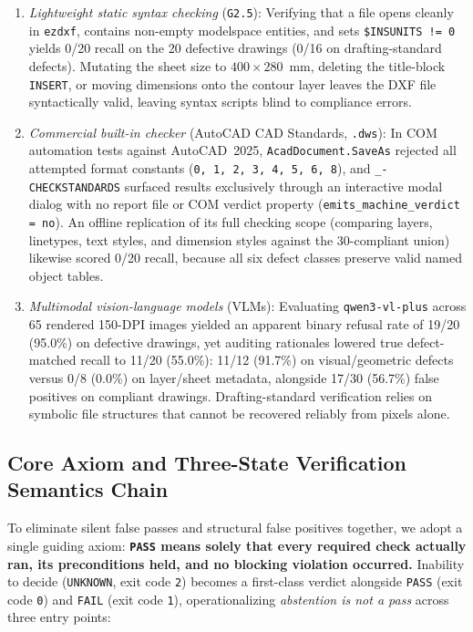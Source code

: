 \documentclass[nocopyright,nolists,upint,varvw,hyphenate]{asmejour}
\begin{document}
\begin{enumerate}
\item \emph{Lightweight static syntax checking} (\texttt{G2.5}): Verifying that a file opens cleanly in \texttt{ezdxf}, contains non-empty modelspace entities, and sets \texttt{\$INSUNITS != 0} yields 0/20 recall on the 20 defective drawings (0/16 on drafting-standard defects). Mutating the sheet size to $400 \times 280$~mm, deleting the title-block \texttt{INSERT}, or moving dimensions onto the contour layer leaves the DXF file syntactically valid, leaving syntax scripts blind to compliance errors.

\item \emph{Commercial built-in checker} (AutoCAD CAD Standards, \texttt{.dws}): In COM automation tests against AutoCAD~2025, \texttt{AcadDocument.SaveAs} rejected all attempted format constants (\texttt{0, 1, 2, 3, 4, 5, 6, 8}), and \texttt{\_-CHECKSTANDARDS} surfaced results exclusively through an interactive modal dialog with no report file or COM verdict property (\texttt{emits\_machine\_verdict = no}). An offline replication of its full checking scope (comparing layers, linetypes, text styles, and dimension styles against the 30-compliant union) likewise scored 0/20 recall, because all six defect classes preserve valid named object tables.

\item \emph{Multimodal vision-language models} (VLMs): Evaluating \texttt{qwen3-vl-plus} across 65 rendered 150-DPI images yielded an apparent binary refusal rate of 19/20 (95.0\%) on defective drawings, yet auditing rationales lowered true defect-matched recall to 11/20 (55.0\%): 11/12 (91.7\%) on visual/geometric defects versus 0/8 (0.0\%) on layer/sheet metadata, alongside 17/30 (56.7\%) false positives on compliant drawings. Drafting-standard verification relies on symbolic file structures that cannot be recovered reliably from pixels alone.
\end{enumerate}

\subsection{Core Axiom and Three-State Verification Semantics Chain}\label{sec:intro_axiom}

To eliminate silent false passes and structural false positives together, we adopt a single guiding axiom: \textbf{\texttt{PASS} means solely that every required check actually ran, its preconditions held, and no blocking violation occurred.} Inability to decide (\texttt{UNKNOWN}, exit code \texttt{2}) becomes a first-class verdict alongside \texttt{PASS} (exit code \texttt{0}) and \texttt{FAIL} (exit code \texttt{1}), operationalizing \emph{abstention is not a pass} across three entry points:
\end{document}
